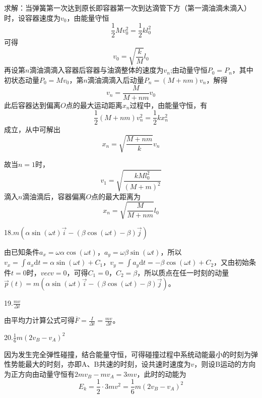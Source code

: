 \documentclass[blue, pad]{./templete/qyxfnote}
\newcommand{\di}[1]{\mathrm{d}#1}
\begin{document}
			求解：当弹簧第一次达到原长即容器第一次到达滴管下方（第一滴油滴未滴入）时，设容器速度为$v_0$，由能量守恒
			\begin{equation*}
			\frac{1}{2}Mv_0^2=\frac{1}{2}kl_0^2
			\end{equation*}
			可得
			\begin{equation*}
			v_0=\sqrt{\frac{k}{M}}l_0
			\end{equation*}
			再设第$n$滴油滴滴入容器后容器与油滴整体的速度为$v_n$;由动量守恒$P_0=P_n$，其中初状态动量$P_0=Mv_0$，第$n$滴油滴滴入后动量$P_n=(M+nm)v_n$，解得
			\begin{equation*}
			v_n=\frac{M}{M+nm}v_0
			\end{equation*}
			此后容器达到偏离$O$点的最大运动距离$x_n$过程中，由能量守恒，有
			\begin{equation*}
			\frac{1}{2}(M+nm)v_n^2=\frac{1}{2}kx_n^2
			\end{equation*}
			成立，从中可解出
			\begin{equation*}
			x_n=\sqrt{\frac{M+nm}{k}}v_n
			\end{equation*}
			
			故当$n=1$时，
			\begin{equation*}
			v_1=\sqrt{\frac{kMl_0^2}{(M+m)^2}}
			\end{equation*}
			滴入$n$滴油滴后，容器偏离$O$点的最大距离为
			\begin{equation*}
			x_n=\sqrt{\frac{M}{M+nm}}l_0
			\end{equation*}
			
			18.$m(\alpha\sin(\omega t)\vec{i}-(\beta\cos(\omega t)-\beta)\vec{j})$
			
			由已知条件$a_x=\omega\alpha\cos(\omega t)，a_y=\omega\beta\sin(\omega t)$，所以$v_x=\int a_x\di t=\alpha\sin(\omega t)+C_1，v_y=\int a_y\di t=-\beta\cos(\omega t)+C_2$，又由初始条件$t=0$时，$vec{v}=0$，可得$C_1=0，C_2=\beta$，所以质点在任一时刻的动量$\vec{p}(t)=m(\alpha\sin(\omega t)\vec{i}-(\beta\cos(\omega t)-\beta)\vec{j})$。
			
			19.$\frac{mv}{\Delta t}$
			
			由平均力计算公式可得$\overline{F}=\frac{I}{\Delta t}=\frac{mv}{\Delta t}$。
			
			20.$\frac{1}{6}m(2v_B-v_A)^2$
			
			因为发生完全弹性碰撞，结合能量守恒，可得碰撞过程中系统动能最小的时刻为弹性势能最大的时刻，亦即A、B共速的时刻，设共速时速度为$v$，则设B运动的方向为正方向由动量守恒有$2mv_B-mv_A=3mv$，此时的动能为
			\begin{equation*}
			E_k=\frac{1}{2}\cdot 3mv^2=\frac{1}{6}m(2v_B-v_A)^2
			\end{equation*}
\end{document}
